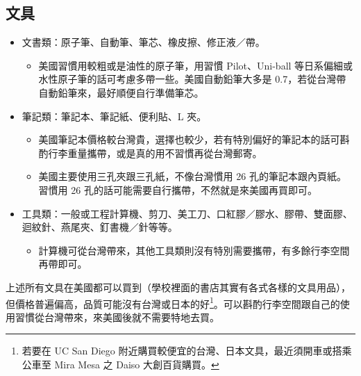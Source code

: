 \documentclass[10pt,a4paper]{book}
\begin{document}
\begin{CJK}{UTF8}{bkai}
\section{文具}
\begin{itemize}
\item 文書類：原子筆、自動筆、筆芯、橡皮擦、修正液／帶。
\begin{itemize}
\item 美國習慣用較粗或是油性的原子筆，用習慣 Pilot、Uni-ball 等日系偏細或水性原子筆的話可考慮多帶一些。美國自動鉛筆大多是 0.7，若從台灣帶自動鉛筆來，最好順便自行準備筆芯。
\end{itemize}
\item 筆記類：筆記本、筆記紙、便利貼、L 夾。
\begin{itemize}
\item 美國筆記本價格較台灣貴，選擇也較少，若有特別偏好的筆記本的話可斟酌行李重量攜帶，或是真的用不習慣再從台灣郵寄。
\item 美國主要使用三孔夾跟三孔紙，不像台灣慣用 26 孔的筆記本跟內頁紙。習慣用 26 孔的話可能需要自行攜帶，不然就是來美國再買即可。
\end{itemize}
\item 工具類：一般或工程計算機、剪刀、美工刀、口紅膠／膠水、膠帶、雙面膠、迴紋針、燕尾夾、釘書機／針等等。
\begin{itemize}
\item 計算機可從台灣帶來，其他工具類則沒有特別需要攜帶，有多餘行李空間再帶即可。
\end{itemize}
\end{itemize}
上述所有文具在美國都可以買到（學校裡面的書店其實有各式各樣的文具用品），但價格普遍偏高，品質可能沒有台灣或日本的好\footnote{若要在 UC San Diego 附近購買較便宜的台灣、日本文具，最近須開車或搭乘公車至 Mira Mesa 之 Daiso 大創百貨購買。}。可以斟酌行李空間跟自己的使用習慣從台灣帶來，來美國後就不需要特地去買。



\end{CJK}
\end{document}
